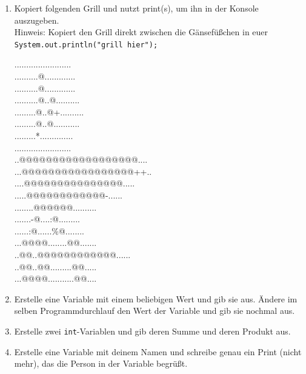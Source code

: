 \documentclass{../../sheet}
\begin{document}
\begin{enumerate}
	\item Kopiert folgenden Grill und nutzt print(s), um ihn in der Konsole auszugeben.\\
	      Hinweis: Kopiert den Grill direkt zwischen die Gänsefüßchen in euer \\\texttt{System.out.println("grill hier");}
	      \begin{ausgabe}
		      ........................\\
		      ..........@.............\\
		      ..........@.............\\
		      ..........@..@..........\\
		      .........@..@+..........\\
		      .........@..@...........\\
		      .........*..............\\
		      ........................\\
		      ..@@@@@@@@@@@@@@@@@@....\\
		      ...@@@@@@@@@@@@@@@@@++..\\
		      ....@@@@@@@@@@@@@@@.....\\
		      .....@@@@@@@@@@@@-......\\
		      ........@@@@@@..........\\
		      .......-@....:@.........\\
		      ......:@......\%@........\\
		      ...@@@@........@@.......\\
		      ..@@..@@@@@@@@@@@@......\\
		      ..@@..@@.........@@.....\\
		      ...@@@@...........@@....
	      \end{ausgabe}
	\item Erstelle eine Variable mit einem beliebigen Wert und gib sie aus. Ändere im selben Programmdurchlauf den Wert der Variable und gib sie nochmal aus.
	\item Erstelle zwei \texttt{int}-Variablen und gib deren Summe und deren Produkt aus.
	\item Erstelle eine Variable mit deinem Namen und schreibe genau ein Print (nicht mehr), das die Person in der Variable begrüßt.
\end{enumerate}
\end{document}
